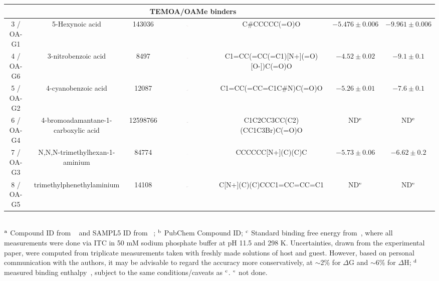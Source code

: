 \documentclass[aps,pre,twocolumn,nofootinbib,superscriptaddress,10pt, final,tightenlines]{revtex4-1}
\begin{document}
\begin{table}
\begin{tabular}{@{}| c | c | c | c | c | c | c | @{}}
\hline
\multicolumn{6}{|c|}{TEMOA/OAMe binders} \\\hline
3 / OA-G1 &	\tiny{5-Hexynoic acid} &	 143036  & \includegraphics[width=0.04\textwidth]{figures/143036.pdf} &  \tiny{C\#CCCCC(=O)O} & $-5.476 \pm 0.006$ & $-9.961 \pm 0.006$  \\
4 / OA-G6 &	\tiny{3-nitrobenzoic acid} & 	8497 & \includegraphics[width=0.04\textwidth]{figures/8497.pdf} &  \tiny{C1=CC(=CC(=C1)[N+](=O)[O-])C(=O)O} &  $-4.52 \pm 0.02$ &  $-9.1 \pm 0.1$ \\
5 / OA-G2	& \tiny{4-cyanobenzoic acid} &	12087 & \includegraphics[width=0.04\textwidth]{figures/12087.pdf} &  \tiny{C1=CC(=CC=C1C\#N)C(=O)O} & $-5.26 \pm 0.01$ & $-7.6 \pm 0.1 $ \\
6 / OA-G4	& \tiny{4-bromoadamantane-1-carboxylic acid} & 12598766 & \includegraphics[width=0.04\textwidth]{figures/12598766.pdf} &  \tiny{C1C2CC3CC(C2)(CC1C3Br)C(=O)O} & ND$^{\rm e}$  & ND$^{\rm e}$ \\  
7 /  OA-G3 &	\tiny{N,N,N-trimethylhexan-1-aminium} &	84774 & \includegraphics[width=0.04\textwidth]{figures/84774.pdf} & \tiny{CCCCCC[N+](C)(C)C} & $-5.73 \pm 0.06 $ & $-6.62 \pm 0.2$ \\ 
8 / OA-G5	 & \tiny{trimethylphenethylaminium} &	14108 & \includegraphics[width=0.04\textwidth]{figures/14108.pdf} & \tiny{C[N+](C)(C)CCC1=CC=CC=C1} & ND$^{\rm e}$ & ND$^{\rm e}$ \\


\hline
\end{tabular}\\
$^{\rm a}$ Compound ID from ~\cite{sullivan_binding_2016} and SAMPL5 ID from ~\cite{yin_sampl5_preprint}; $^{\rm b}$ PubChem Compound ID; $^{\rm c}$ Standard binding free energy from~\cite{sullivan_binding_2016}, where all measurements were done via ITC in 50 mM sodium phosphate buffer at pH 11.5 and 298 K. Uncertainties, drawn from the experimental paper, were computed from triplicate measurements taken with freshly made solutions of host and guest. However, based on personal communication with the authors, it may be advisable to regard the accuracy more conservatively, at $\sim$2\% for $\Delta$G and $\sim$6\% for $\Delta$H;  $^{\rm d}$ measured binding enthalpy~\cite{sullivan_binding_2016}, subject to the same conditions/caveats as $^{\rm c}$. $^{\rm e}$ not done.
\end{table}
\endgroup
\end{document}

